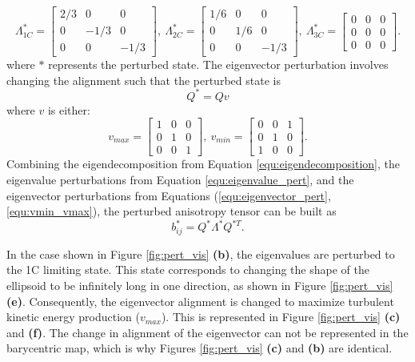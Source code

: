 \begin{equation}\label{equ:eigenvalue_pert}
    \Lambda^*_{1C} = 
    \begin{bmatrix}
    2/3 & 0    & 0 \\
    0   & -1/3 & 0 \\
    0   & 0    & -1/3
    \end{bmatrix},~
    \Lambda^*_{2C} = 
    \begin{bmatrix}
    1/6 & 0   & 0 \\
    0   & 1/6 & 0 \\
    0   & 0   & -1/3
    \end{bmatrix},~
    \Lambda^*_{3C} = 
    \begin{bmatrix}
    0 & 0 & 0 \\
    0 & 0 & 0 \\
    0 & 0 & 0
    \end{bmatrix}.
\end{equation}
where $*$ represents the perturbed state.
The eigenvector perturbation involves changing the alignment such that the perturbed state is
\begin{equation}\label{equ:eigenvector_pert}
    Q^* = Qv
\end{equation}
where $v$ is either:
\begin{equation}\label{equ:vmin_vmax}
    v_{max} = 
    \begin{bmatrix}
    1 & 0 & 0 \\
    0 & 1 & 0 \\
    0 & 0 & 1
    \end{bmatrix},~
    v_{min} = 
    \begin{bmatrix}
    0 & 0 & 1 \\
    0 & 1 & 0 \\
    1 & 0 & 0
    \end{bmatrix}.
\end{equation}
Combining the eigendecomposition from Equation \eqref{equ:eigendecomposition}, the eigenvalue perturbations from Equation \eqref{equ:eigenvalue_pert}, and the eigenvector perturbations from Equations (\ref{equ:eigenvector_pert}, \ref{equ:vmin_vmax}), the perturbed anisotropy tensor can be built as
\begin{equation}
    b^*_{ij}=Q^* \Lambda^* Q^{*T}.
\end{equation}

In the case shown in Figure \ref{fig:pert_vis} \textbf{(b)}, the eigenvalues are perturbed to the 1C limiting state.
This state corresponds to changing the shape of the ellipsoid to be infinitely long in one direction, as shown in Figure \ref{fig:pert_vis} \textbf{(e)}.
Consequently, the eigenvector alignment is changed to maximize turbulent kinetic energy production ($v_{max}$).
This is represented in Figure \ref{fig:pert_vis} \textbf{(c)} and \textbf{(f)}.
The change in alignment of the eigenvector can not be represented in the barycentric map, which is why Figures \ref{fig:pert_vis} \textbf{(c)} and \textbf{(b)} are identical.

